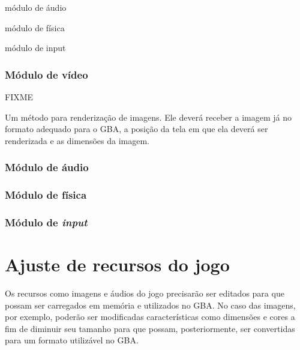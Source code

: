 módulo de áudio

módulo de física

módulo de input

\subsubsection{Módulo de vídeo}
  FIXME

  Um método para renderização de imagens. Ele deverá receber a imagem já no formato adequado para o GBA, a posição da tela em que ela deverá ser renderizada e as dimensões da imagem.

\subsubsection{Módulo de áudio}

\subsubsection{Módulo de física}

\subsubsection{Módulo de \textit{input}}




\section{Ajuste de recursos do jogo}

Os recursos como imagens e áudios do jogo precisarão ser editados para que possam ser carregados em memória e utilizados no GBA. No caso das imagens, por exemplo, poderão ser modificadas características como dimensões e cores a fim de diminuir seu tamanho para que possam, posteriormente, ser convertidas para um formato utilizável no GBA.
